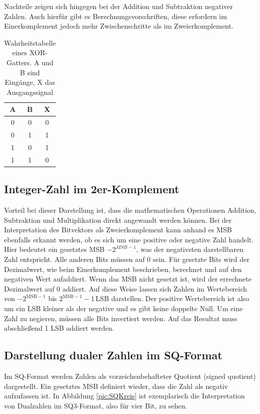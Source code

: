 Nachteile zeigen sich hingegen bei der Addition und Subtraktion negativer Zahlen. Auch hierfür gibt es Berechnungsvorschriften, diese erfordern im Einerkomplement jedoch mehr 
Zwischenschritte als im Zweierkomplement. 

\begin{table}[ht!]
 \centering
 \begin{tabular}{cc|c}
  A& B &X\\
  \hline
  0& 0&0\\
  0& 1&1\\
  1& 0&1\\
  1& 1&0\\
 \end{tabular}
 \caption{Wahrheitstabelle eines XOR-Gatters. A und B sind Eingänge, X das Ausgangssignal}
 \label{tab:xor}
\end{table}



\subsection{Integer-Zahl im 2er-Komplement}\label{sec:Integer2erKomplement}
Vorteil bei dieser Darstellung ist, dass die mathematischen Operationen Addition, Subtraktion und Multiplikation direkt angewandt werden können.
Bei der Interpretation des Bitvektors als Zweierkomplement kann anhand es MSB ebenfalls erkannt werden, ob es sich um eine positive oder negative Zahl handelt. 
Hier bedeutet ein gesetztes MSB $-2^{MSB-1}$, was der negativsten darstellbaren Zahl entspricht. 
Alle anderen Bits müssen auf 0 sein. Für gesetzte Bits wird der Dezimalwert, wie beim Einerkomplement beschrieben, berechnet und auf den negativen Wert aufaddiert. Wenn das MSB nicht gesetzt
ist, wird der errechnete Dezimalwert auf 0 addiert. Auf diese Weise lassen sich Zahlen im Wertebereich von $-2^{\textrm{MSB}-1}$ bis $2^{\textrm{MSB}-1}-1$\,LSB darstellen. Der positive
Wertebereich ist also um ein LSB kleiner als der negative und es gibt keine doppelte Null.
Um eine Zahl zu negieren, müssen alle Bits invertiert werden. Auf das Resultat muss abschließend 1 LSB addiert werden.

\subsection{Darstellung dualer Zahlen im SQ-Format}
Im SQ-Format werden Zahlen als vorzeichenbehafteter Quotient (signed quotient) dargestellt. Ein gesetztes MSB definiert wieder, dass die Zahl als negativ aufzufassen ist.
In Abbildung \ref{pic:SQKreis} ist exemplarisch die Interpretation von Dualzahlen im SQ3-Format, also für vier Bit, zu sehen.

